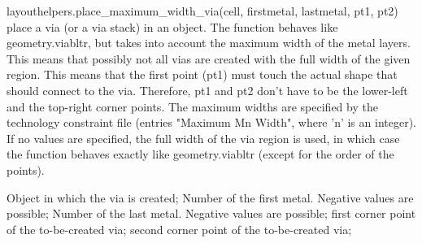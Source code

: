 \begin{APIfunc}{layouthelpers.place\_maximum\_width\_via(cell, firstmetal, lastmetal, pt1, pt2)}
    place a via (or a via stack) in an object. The function behaves like geometry.viabltr, but takes into account the maximum width of the metal layers. This means that possibly not all vias are created with the full width of the given region. This means that the first point (pt1) must touch the actual shape that should connect to the via. Therefore, pt1 and pt2 don't have to be the lower-left and the top-right corner points. The maximum widths are specified by the technology constraint file (entries "Maximum Mn Width", where 'n' is an integer). If no values are specified, the full width of the via region is used, in which case the function behaves exactly like geometry.viabltr (except for the order of the points).
    \begin{APIparameters}
            Object in which the via is created;
            Number of the first metal. Negative values are possible;
            Number of the last metal. Negative values are possible;
            first corner point of the to-be-created via;
            second corner point of the to-be-created via;
    \end{APIparameters}
\end{APIfunc}
